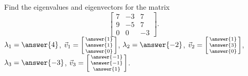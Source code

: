 \documentclass{ximera}
\begin{document}
\begin{exercise}%
    Find the eigenvalues and eigenvectors for the matrix
    \[ 
        \begin{bmatrix} 
            7 & -3 & 7 \\ 
            9 & -5 & 7 \\ 
            0 & 0 & -3
        \end{bmatrix}. 
    \]
    $\lambda_1 = \answer{4}$, $\vec{v}_1 = \left[\begin{smallmatrix} \answer{1} \\ \answer{1} \\ \answer{0}\end{smallmatrix}\right]$, $\lambda_2 = \answer{-2}$, $\vec{v}_2 = \left[\begin{smallmatrix} \answer{1} \\ \answer{3} \\ \answer{0} \end{smallmatrix}\right]$, $\lambda_3 = \answer{-3}$, $\vec{v}_3 = \left[\begin{smallmatrix} \answer{-1} \\ \answer{-1} \\ \answer{1} \end{smallmatrix}\right]$. 
\end{exercise}
\end{document}
